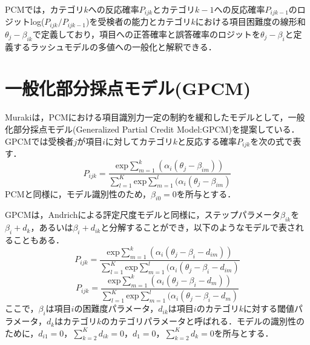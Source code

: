 \documentclass[a4paper,11pt,oneside,openany]{jsbook}
\begin{document}
PCMでは，カテゴリ$k$への反応確率$P_{ijk}$とカテゴリ$k-1$への反応確率$P_{ijk-1}$のロジットlog($P_{ijk}/P_{ijk-1}$)を受検者の能力とカテゴリ$k$における項目困難度の線形和$\theta_{j}-\beta_{ik}$で定義しており，項目への正答確率と誤答確率のロジットを$\theta_{j}-\beta_{i}$と定義するラッシュモデルの多値への一般化と解釈できる．

\section{一般化部分採点モデル(GPCM)}
Murakiは，PCMにおける項目識別力一定の制約を緩和したモデルとして，一般化部分採点モデル(Generalized Partial Credit Model:GPCM)\cite{GPCM}を提案している．GPCMでは受検者$j$が項目$i$に対してカテゴリ$k$と反応する確率$P_{ijk}$を次の式で表す．
\begin{equation}
P_{ijk} = \frac{\mathrm{exp}\sum_{m=1}^{k}(\alpha_{i}(\theta_{j}-\beta_{im}))}{\sum_{l=1}^{K} \mathrm{exp}\sum_{m=1}^{l}(\alpha_{i}(\theta_{j}-\beta_{im})}
\end{equation}
PCMと同様に，モデル識別性のため，$\beta_{i0}=0$を所与とする．

GPCMは，Andrichによる評定尺度モデル\cite{RSM}と同様に，ステップパラメータ$\beta_{ik}$を$\beta_{i}+d_{k}$，あるいは$\beta_{i}+d_{ik}$と分解することができ，以下のようなモデルで表されることもある．
\begin{equation}
P_{ijk} = \frac{\mathrm{exp}\sum_{m=1}^{k}(\alpha_{i}(\theta_{j}-\beta_{i}-d_{im}))}{\sum_{l=1}^{K} \mathrm{exp}\sum_{m=1}^{l}(\alpha_{i}(\theta_{j}-\beta_{i}-d_{im})}
\end{equation}
\begin{equation}
P_{ijk} = \frac{\mathrm{exp}\sum_{m=1}^{k}(\alpha_{i}(\theta_{j}-\beta_{i}-d_{m}))}{\sum_{l=1}^{K} \mathrm{exp}\sum_{m=1}^{l}(\alpha_{i}(\theta_{j}-\beta_{i}-d_{m})}
\end{equation}
ここで，$\beta_{i}$は項目$i$の困難度パラメータ，$d_{ik}$は項目$i$のカテゴリ$k$に対する閾値パラメータ，$d_k$はカテゴリ$k$のカテゴリパラメータと呼ばれる．モデルの識別性のために，$d_{i1}=0，\sum_{k=2}^{K}d_{ik}=0，d_1=0，\sum_{k=2}^{K}d_{k}=0$を所与とする．

\newpage
\end{document}
